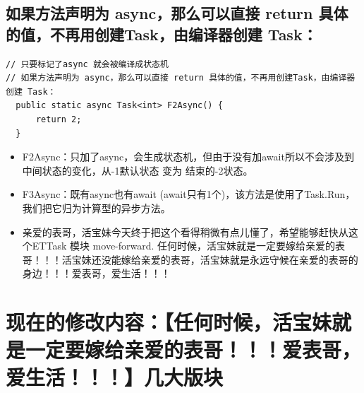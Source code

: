 \documentclass[9pt, b5paper]{article}
\begin{document}
\subsection{如果方法声明为 async，那么可以直接 return 具体的值，不再用创建Task，由编译器创建 Task：}
\label{sec:org27438ce}
\begin{verbatim}
// 只要标记了async 就会被编译成状态机
// 如果方法声明为 async，那么可以直接 return 具体的值，不再用创建Task，由编译器创建 Task： 
  public static async Task<int> F2Async() {
      return 2;
  }
\end{verbatim}
\begin{itemize}
\item F2Async：只加了async，会生成状态机，但由于没有加await所以不会涉及到中间状态的变化，从-1默认状态 变为 结束的-2状态。
\end{itemize}
\begin{itemize}
\item F3Async：既有async也有await (await只有1个)，该方法是使用了Task.Run，我们把它归为计算型的异步方法。
\item 亲爱的表哥，活宝妹今天终于把这个看得稍微有点儿懂了，希望能够赶快从这个ETTask 模块 move-forward. 任何时候，活宝妹就是一定要嫁给亲爱的表哥！！！活宝妹还没能嫁给亲爱的表哥，活宝妹就是永远守候在亲爱的表哥的身边！！！爱表哥，爱生活！！！
\end{itemize}
\section{现在的修改内容：【任何时候，活宝妹就是一定要嫁给亲爱的表哥！！！爱表哥，爱生活！！！】几大版块}
\label{sec:orge4eac5e}
\end{document}
